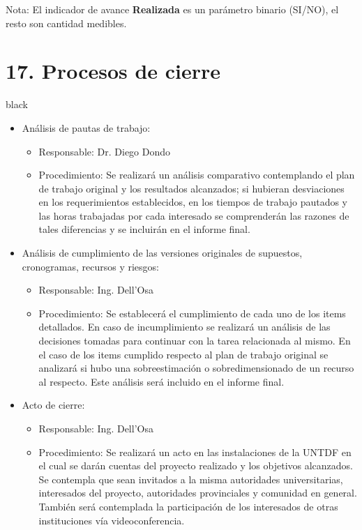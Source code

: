 \documentclass[11pt]{charter}
\begin{document}
Nota: El indicador de avance \textbf{Realizada} es un parámetro binario (SI/NO), el resto son cantidad medibles.
	
\pagebreak
\section{17. Procesos de cierre}    
\label{sec:cierre}

\begin{consigna}{black}


\begin{itemize}
\item Análisis de pautas de trabajo:
	\begin{itemize}
		\item Responsable: Dr. Diego Dondo
		\item Procedimiento: Se realizará un análisis comparativo contemplando el plan de trabajo original y los resultados alcanzados; si hubieran desviaciones en los requerimientos establecidos, en los tiempos de trabajo pautados y las horas trabajadas por cada interesado se comprenderán las razones de tales diferencias y se incluirán en el informe final.
	\end{itemize}
\item Análisis de cumplimiento de las versiones originales de supuestos, cronogramas, recursos y riesgos:
	\begin{itemize}
		\item Responsable: Ing. Dell'Osa
		\item Procedimiento: Se establecerá el cumplimiento de cada uno de los items detallados. En caso de incumplimiento se realizará un análisis de las decisiones tomadas para continuar con la tarea relacionada al mismo. En el caso de los items cumplido respecto al plan de trabajo original se analizará si hubo una sobreestimación o sobredimensionado de un recurso al respecto. Este análisis será incluido en el informe final.
	\end{itemize}

\item Acto de cierre:
\begin{itemize}
		\item Responsable: Ing. Dell'Osa
		\item Procedimiento: Se realizará un acto en las instalaciones de la UNTDF en el cual se darán cuentas del proyecto realizado y los objetivos alcanzados. Se contempla que sean invitados a la misma autoridades universitarias, interesados del proyecto, autoridades provinciales y comunidad en general. También será contemplada la participación de los interesados de otras instituciones vía videoconferencia.
	\end{itemize}
\end{itemize}
\end{consigna}
\end{document}
